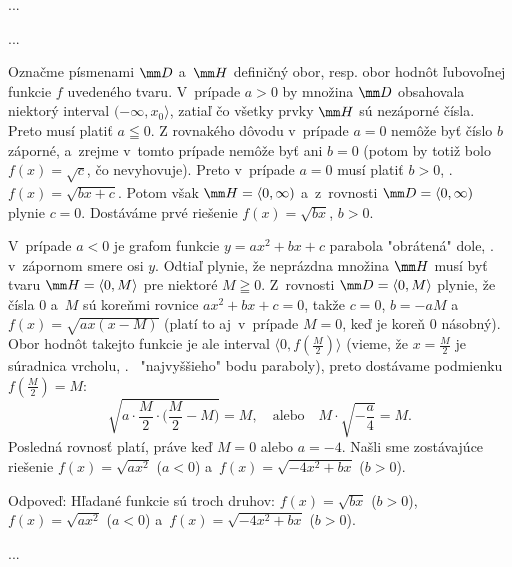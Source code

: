 {%
...}

{%
...}

{%
Označme písmenami $\mm D$ a~$\mm H$ definičný obor, resp.
obor hodnôt ľubovoľnej funkcie $f$ uvedeného tvaru. V~prípade $a>0$
by množina $\mm D$ obsahovala niektorý interval $(-\infty,x_0\rangle$,
zatiaľ čo všetky prvky $\mm H$ sú
nezáporné čísla. Preto musí platiť $a\leqq0$. Z rovnakého dôvodu
v~prípade $a=0$ nemôže byť číslo $b$ záporné, a~zrejme v~tomto
prípade nemôže byť ani $b=0$ (potom by totiž bolo $f(x)=\sqrt{c}$,
čo nevyhovuje). Preto v~prípade $a=0$ musí platiť $b>0$, \tj.~
$f(x)=\sqrt{bx+c}$. Potom však $\mm H=\langle0,\infty)$
a~z~rovnosti $\mm D=\langle0,\infty)$ plynie $c=0$. Dostáváme
prvé riešenie $f(x)=\sqrt{bx}$, $b>0$.

V~prípade $a<0$ je grafom funkcie $y=ax^2+bx+c$ parabola
"obrátená" dole, \tj. v~zápornom smere osi $y$. Odtiaľ plynie, že
neprázdna množina $\mm H$ musí byť tvaru $\mm H=\langle0,M\rangle$ pre
niektoré $M\geqq0$. Z~rovnosti $\mm D=\langle0,M\rangle$ plynie, že
čísla $0$ a~$M$  sú koreňmi rovnice $ax^2+bx+c=0$, takže $c=0$,
$b=-aM$ a~$f(x)=\sqrt{ax(x-M)}$ (platí to aj~v~prípade $M=0$, keď je
koreň $0$ násobný). Obor hodnôt takejto funkcie je ale interval
$\langle0,f(\frac M2)\rangle$ (vieme, že $x=\frac M2$ je súradnica
vrcholu, \tj.~ "najvyššieho" bodu paraboly), preto dostávame podmienku
$f(\frac M2)=M$:
$$
\sqrt{a\cdot\frac M2\cdot\Big(\frac
M2-M\Big)}=M,\quad\text{alebo}\quad
M\cdot\sqrt{-\frac a4}=M.
$$
Posledná rovnosť platí, práve keď $M=0$ alebo $a=-4$. Našli sme
zostávajúce riešenie
$f(x)=\sqrt{ax^2}$ ($a<0$) a~$f(x)=\sqrt{-4x^2+bx}$ ($b>0$).

Odpoveď: Hľadané funkcie sú troch druhov: $f(x)=\sqrt{bx}$ ($b>0$),
$f(x)=\sqrt{ax^2}$ ($a<0$) a~$f(x)=\sqrt{-4x^2+bx}$ ($b>0$).
}

{%
...}


